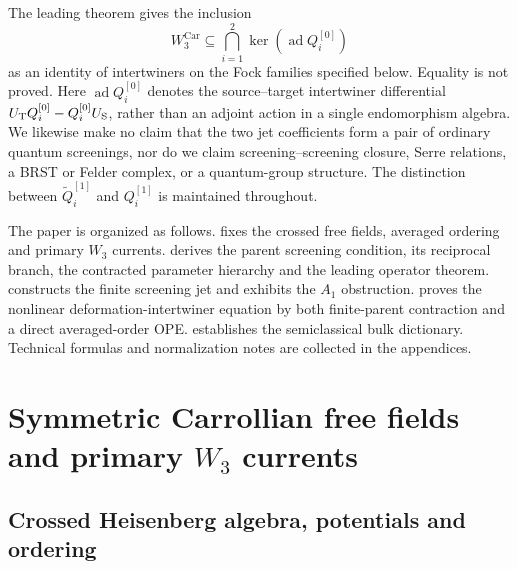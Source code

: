 \documentclass[11pt,a4paper]{article}
\numberwithin{equation}{section}
\theoremstyle{remark}
\newcommand{\Car}{\mathrm{Car}}
\newcommand{\ad}{\operatorname{ad}}
\newcommand{\T}{\mathrm{T}}
\begin{document}
The leading theorem gives the inclusion
\begin{equation}
  W_3^{\Car}\subseteq \bigcap_{i=1}^{2}\ker\!\left(\ad Q_i^{[0]}\right)
  \label{eq:kernel-inclusion}
\end{equation}
as an identity of intertwiners on the Fock families specified below.  Equality is not proved.
Here $\ad Q_i^{[0]}$ denotes the source--target intertwiner differential
$U_{\T}Q_i^{[0]}-Q_i^{[0]}U_{\rm S}$, rather than an adjoint action in a single
endomorphism algebra.
We likewise make no claim that the two jet coefficients form a pair of ordinary quantum
screenings, nor do we claim screening--screening closure, Serre relations, a BRST or Felder
complex, or a quantum-group structure.  The distinction
between $\widetilde Q_i^{[1]}$ and $Q_i^{[1]}$ is maintained throughout.

The paper is organized as follows.   fixes the crossed free fields,
averaged ordering and primary $W_3$ currents.   derives the parent
screening condition, its reciprocal branch, the contracted parameter hierarchy and the leading
operator theorem.   constructs the finite screening jet and exhibits the $A_1$
obstruction.   proves the nonlinear deformation-intertwiner equation by
both finite-parent contraction and a direct averaged-order OPE.   establishes
the semiclassical bulk dictionary.  Technical formulas and normalization notes are collected in
the appendices.

\section{Symmetric Carrollian free fields and primary \texorpdfstring{$W_3$}{W3} currents}
\label{sec:free-fields}

\subsection{Crossed Heisenberg algebra, potentials and ordering}
\end{document}
